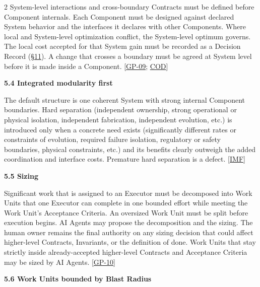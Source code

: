\begin{multicols}{2}
System-level interactions and cross-boundary Contracts must be defined before Component internals. Each Component must be designed against declared System behavior and the interfaces it declares with other Components. Where local and System-level optimization conflict, the System-level optimum governs. The local cost accepted for that System gain must be recorded as a Decision Record (\hyperlink{nss-11}{\S11}). A change that crosses a boundary must be agreed at System level before it is made inside a Component. [\hyperlink{gp-09}{GP-09}; \hyperlink{gp-COD}{COD}]

\hypertarget{nss-5.4}{}

\par\smallskip\noindent\textbf{5.4 Integrated modularity first}\par\nopagebreak

The default structure is one coherent System with strong internal Component boundaries. Hard separation (independent ownership, strong operational or physical isolation, independent fabrication, independent evolution, etc.) is introduced only when a concrete need exists (significantly different rates or constraints of evolution, required failure isolation, regulatory or safety boundaries, physical constraints, etc.) and its benefits clearly outweigh the added coordination and interface costs. Premature hard separation is a defect. [\hyperlink{gp-IMF}{IMF}]

\hypertarget{nss-5.5}{}

\par\smallskip\noindent\textbf{5.5 Sizing}\par\nopagebreak

Significant work that is assigned to an Executor must be decomposed into Work Units that one Executor can complete in one bounded effort while meeting the Work Unit’s Acceptance Criteria. An oversized Work Unit must be split before execution begins. AI Agents may propose the decomposition and the sizing. The human owner remains the final authority on any sizing decision that could affect higher-level Contracts, Invariants, or the definition of done. Work Units that stay strictly inside already-accepted higher-level Contracts and Acceptance Criteria may be sized by AI Agents. [\hyperlink{gp-10}{GP-10}]

\hypertarget{nss-5.6}{}

\par\smallskip\noindent\textbf{5.6 Work Units bounded by Blast Radius}\par\nopagebreak


\end{multicols}

